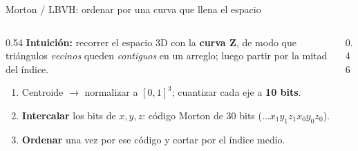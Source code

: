 \documentclass[aspectratio=169,11pt]{beamer}
\newcommand{\hl}[1]{{\color{primdk}\textbf{#1}}}
\begin{document}
\begin{frame}{Morton / LBVH: ordenar por una curva que llena el espacio}
\begin{columns}[c]
\begin{column}{0.54\textwidth}
\textbf{Intuici\'on:} recorrer el espacio 3D con la \hl{curva Z}, de modo que
tri\'angulos \emph{vecinos} queden \emph{contiguos} en un arreglo; luego partir por
la mitad del \'indice.
\begin{enumerate}\itemsep1pt
  \item Centroide $\to$ normalizar a $[0,1]^3$; cuantizar cada eje a \hl{10 bits}.
  \item \hl{Intercalar} los bits de $x,y,z$: c\'odigo Morton de 30 bits
        ($\dots x_1y_1z_1x_0y_0z_0$).
  \item \hl{Ordenar} una vez por ese c\'odigo y cortar por el \'indice medio.
\end{enumerate}
\end{column}
\begin{column}{0.46\textwidth}\centering
{}
\end{column}
\end{columns}
\end{frame}
\end{document}
